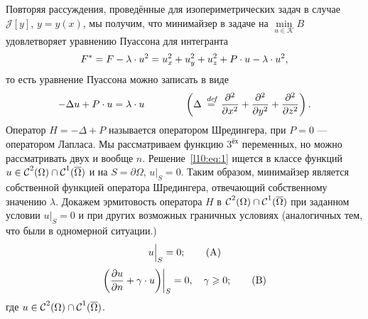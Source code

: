 \documentclass[12pt,a4paper,openany,fleqn]{book}
\newcommand {\defeq}{\stackrel{\hspace{0.09 cm}de\!f}{=}}
\newcommand {\eqdef}{\defeq}
\newcommand{\Cf}{\ensuremath{\mathcal{C}}}
\newcommand{\J}{\ensuremath{\mathcal{J}}}
\newcommand{\mc}[1]{\ensuremath{\mathcal{#1}}}
\newcommand{\Cfn}[2][]{\ensuremath{\Cf{\mathstrut}^{#2}_{#1}}}
\newcommand{\pder}[2]{\ensuremath{\frac{\partial#1}{\partial#2}}}
\newcommand{\pdder}[2]{\ensuremath{\frac{\partial^2#1}{\partial#2^2}}}
\newcommand{\K}{\mc{K}}
\theoremstyle{definition}
\begin{document}
	Повторяя рассуждения, проведённые для изопериметрических задач в случае $\J[y]$, $y=y(x)$, мы получим, что минимайзер в задаче на $\displaystyle\min\limits_{u\in\K}B$ удовлетворяет уравнению Пуассона для интегранта
	\begin{equation*}
		\hfill F^{\ast}=F-\lambda\cdot u^2=u_x^2+u_y^2+u_z^2+P\cdot u-\lambda\cdot u^2,\hfill
	\end{equation*}
	то есть уравнение Пуассона можно записать в виде
	\begin{equation}\label{l10:eq:1}
		\hfill-\Delta u+P\cdot u=\lambda\cdot u\qquad\qquad\left(\Delta\eqdef\pdder{}{x}+\pdder{}{y}+\pdder{}{z}\right).\hfill
	\end{equation}
	Оператор $H=-\Delta+P$ называется оператором Шредингера, при $P=0$ --- оператором Лапласа. Мы рассматриваем функцию $3^{\text{ёх}}$ переменных, но можно рассматривать двух и вообще $n$. Решение~\eqref{l10:eq:1} ищется в классе функций $u\in\Cfn{2}(\Omega)\cap\Cfn{1}(\overline{\Omega})$ и на $S=\partial\Omega$, $u\Big|_{S}=0$. Таким образом, минимайзер является собственной функцией оператора Шредингера, отвечающий собственному значению $\lambda$. Докажем эрмитовость оператора $H$ в $\Cfn{2}(\Omega)\cap\Cfn{1}(\overline{\Omega})$ при заданном условии $u\Big|_{S}=0$ и при других возможных граничных условиях (аналогичных тем, что были в одномерной ситуации.)
	\begin{equation}\label{l10:eq:A}
		\hfill u\Big|_{S}=0;\tag{A}\hfill
	\end{equation}
	\begin{equation}\label{l10:eq:B}
		\hfill \left(\pder{u}{n}+\gamma\cdot u\middle)\right|_{S}=0,\quad\gamma\geqslant0;\tag{B}\hfill
	\end{equation}
	где $u\in\Cfn{2}(\Omega)\cap\Cfn{1}(\overline{\Omega})$.
	
\end{document}
